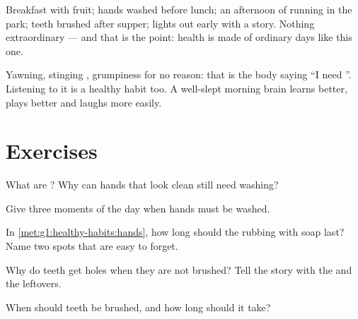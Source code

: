 \begin{example}\label{ex:g1:healthy-habits:day}
Breakfast with fruit; hands washed before lunch; an afternoon of
running in the park; teeth brushed after supper; lights out early
with a story. Nothing extraordinary --- and that is the point:
health is made of ordinary days like this one.
\end{example}

\begin{remark}\label{rem:g1:healthy-habits:tired}
Yawning, stinging , grumpiness for no reason: that is the body
saying ``I need ''. Listening to it is a healthy habit too.
A well-slept morning brain learns better, plays better and laughs
more easily.
\end{remark}

\section{Exercises}

\begin{exercise}[$\star$]\label{exo:g1:healthy-habits:1}
What are ? Why can hands that look clean still need washing?
\end{exercise}

\begin{exercise}[$\star$]\label{exo:g1:healthy-habits:2}
Give three moments of the day when hands must be washed.
\end{exercise}

\begin{exercise}[$\star$]\label{exo:g1:healthy-habits:3}
In \cref{met:g1:healthy-habits:hands}, how long should the rubbing
with soap last? Name two spots that are easy to forget.
\end{exercise}

\begin{exercise}[$\star$]\label{exo:g1:healthy-habits:4}
Why do teeth get holes when they are not brushed? Tell the story
with the  and the leftovers.
\end{exercise}

\begin{exercise}[$\star$]\label{exo:g1:healthy-habits:5}
When should teeth be brushed, and how long should it take?
\end{exercise}

